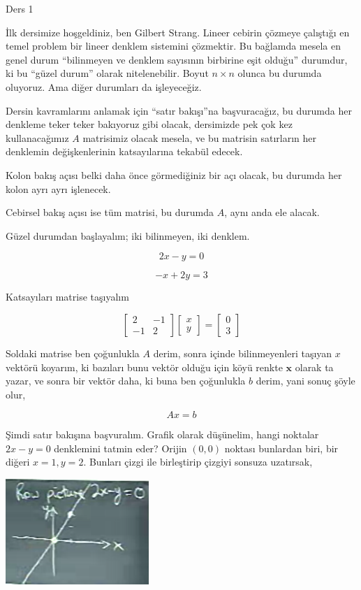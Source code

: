 \documentclass[12pt,fleqn]{article}\usepackage{../../common}
\begin{document}
Ders 1

İlk dersimize hoşgeldiniz, ben Gilbert Strang. Lineer cebirin çözmeye
çalıştığı en temel problem bir lineer denklem sistemini çözmektir. Bu
bağlamda mesela en genel durum ``bilinmeyen ve denklem sayısının birbirine
eşit olduğu'' durumdur, ki bu ``güzel durum'' olarak nitelenebilir. Boyut
$n \times n$ olunca bu durumda oluyoruz. Ama diğer durumları da
işleyeceğiz. 

Dersin kavramlarını anlamak için  ``satır bakışı''na başvuracağız, bu
durumda her denkleme teker teker bakıyoruz gibi olacak, dersimizde pek çok
kez kullanacağımız $A$ matrisimiz olacak mesela, ve bu matrisin satırların
her denklemin değişkenlerinin katsayılarına tekabül edecek.

Kolon bakış açısı belki daha önce görmediğiniz bir açı olacak, bu durumda
her kolon ayrı ayrı işlenecek. 

Cebirsel bakış açısı ise tüm matrisi, bu durumda $A$, aynı anda ele alacak.

Güzel durumdan başlayalım; iki bilinmeyen, iki denklem.

$$ 2x - y = 0 $$

$$ -x + 2y = 3 $$

Katsayıları matrise taşıyalım

$$ 
\left[\begin{array}{cc}
2 & -1 \\
-1 & 2
\end{array}\right]
\left[\begin{array}{c}
x \\
y
\end{array}\right]
=
\left[\begin{array}{c}
0 \\
3
\end{array}\right]
 $$

Soldaki matrise ben çoğunlukla $A$ derim, sonra içinde bilinmeyenleri
taşıyan $x$ vektörü koyarım, ki bazıları bunu vektör olduğu için köyü
renkte $\mathbf{x}$ olarak ta yazar, ve sonra bir vektör daha, ki buna ben
çoğunlukla $b$ derim, yani sonuç şöyle olur,

$$ A x = b $$

Şimdi satır bakışına başvuralım. Grafik olarak düşünelim, hangi noktalar
$2x - y = 0$ denklemini tatmin eder? Orijin $(0,0)$ noktası bunlardan biri,
bir diğeri $x=1,y=2$. Bunları çizgi ile birleştirip çizgiyi sonsuza uzatırsak,

\includegraphics[height=4cm]{1_01.png}
\end{document}
